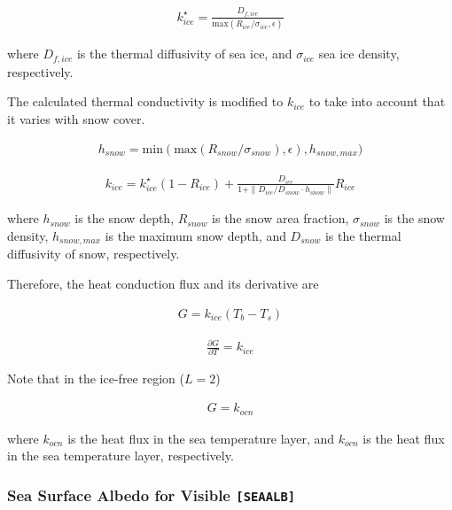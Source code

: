 \begin{itemize}
\begin{eqnarray}
k_{ice}^\star = \frac{D_{f,ice}}{\mathrm{max}(R_{ice}/\sigma_{ice}, \epsilon)}
\end{eqnarray}

where \(D_{f,ice}\) is the thermal diffusivity of sea ice, and
\(\sigma_{ice}\) sea ice density, respectively.

The calculated thermal conductivity is modified to \(k_{ice}\) to take
into account that it varies with snow cover.

\begin{eqnarray}
h_{snow} = \mathrm{min}(
    \mathrm{max}(
    R_{snow}/\sigma_{snow}),\epsilon
        ),h_{snow,max}
        )
\end{eqnarray}

\begin{eqnarray}      
k_{ice} = k_{ice}^\star (1-R_{ice}) + \frac{D_{ice}}{1+\| D_{ice}/D_{snow} \cdot h_{snow} \|} R_{ice}
\end{eqnarray}

where \(h_{snow}\) is the snow depth, \(R_{snow}\) is the snow area
fraction, \(\sigma_{snow}\) is the snow density, \(h_{snow,max}\) is the
maximum snow depth, and \(D_{snow}\) is the thermal diffusivity of snow,
respectively.

Therefore, the heat conduction flux and its derivative are

\begin{eqnarray}
 G = k_{ice} (T_b - T_s)
\end{eqnarray}

\begin{eqnarray}
 \frac{\partial G}{\partial T} = k_{ice}
\end{eqnarray}

Note that in the ice-free region (\(L=2\))

\begin{eqnarray}
G=k_{ocn}
\end{eqnarray}

where \(k_{ocn}\) is the heat flux in the sea temperature layer, and
\(k_{ocn}\) is the heat flux in the sea temperature layer, respectively.

\hypertarget{sea-surface-albedo-for-visible-seaalb}{%
\subsubsection{\texorpdfstring{Sea Surface Albedo for Visible
\texttt{{[}SEAALB{]}}}{Sea Surface Albedo for Visible {[}SEAALB{]}}}\label{sea-surface-albedo-for-visible-seaalb}}


\end{itemize}
